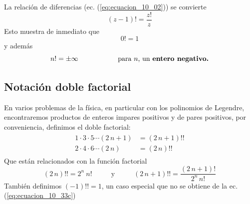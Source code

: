 La relación de diferencias (ec. (\ref{eq:ecuacion_10_02})) se convierte
\begin{equation}
(z - 1)! = \dfrac{z!}{z}
\label{eq:ecuacion_10_29}
\end{equation}
Esto muestra de inmediato que
\begin{equation}
0!= 1
\label{eq:ecuacion_10_30}
\end{equation}
y además
\begin{equation}
n! = \pm \infty \hspace{2cm} \mbox{para $n$, un \textbf{entero negativo.}}
\label{eq:ecuacion_10_31}
\end{equation}
\subsection{Notación doble factorial}
En varios problemas de la física, en particular con los polinomios de Legendre, encontraremos productos de enteros impares positivos y de pares positivos, por conveniencia, definimos el doble factorial:
\begin{align}
\begin{aligned}
1 \cdot 3 \cdot 5 \cdots (2 \, n+1) &= (2 \, n+1) !! \\
2 \cdot 4 \cdot 6 \cdots (2 \, n) &= (2 \, n) !!
\end{aligned}
\label{eq:ecuacion_10_33b}
\end{align}
Que están relacionados con la función factorial
\begin{equation}
(2 \, n)!! =  2^{n} \: n! \hspace{1cm} \mbox{ y } \hspace{1cm} (2 \, n+1)!! = \dfrac{(2 \, n+1)!}{2^{n} \, n!}
\label{eq:ecuacion_10_33c}
\end{equation}
También definimos $(-1)!! = 1$, un caso especial que no se obtiene de la ec. (\ref{eq:ecuacion_10_33c})
